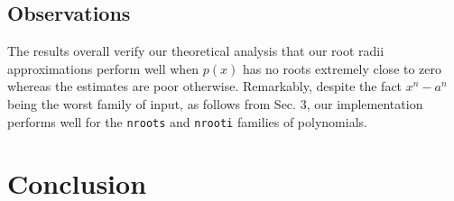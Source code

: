 \documentclass[runningheads]{llncs}
\begin{document}
\subsection{Observations}
The results overall verify our theoretical analysis that our root radii approximations perform well when $p(x)$ has no roots extremely close to zero whereas the estimates are poor otherwise. Remarkably, despite the fact $x^n-a^n$ being the worst family of input, as follows from Sec. 3, our implementation performs well for the \texttt{nroots} and \texttt{nrooti} families of polynomials.



\section{Conclusion}






\appendix
\end{document}
